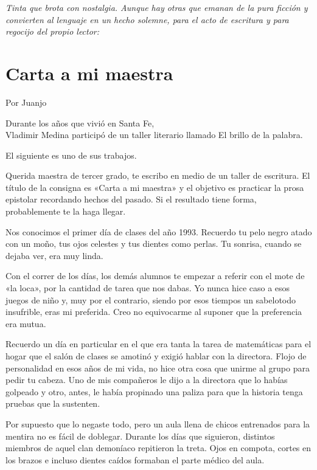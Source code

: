 \documentclass[11pt,twoside,openright,a5paper]{book}
\begin{document}
\vspace{0.5cm}
\emph{Tinta que brota con nostalgia. Aunque hay otras que emanan de la pura ficción y convierten al lenguaje en un hecho solemne, para el acto de escritura y para regocijo del propio lector:}

\section*{Carta a mi maestra}

\begin{flushright}Por Juanjo\end{flushright}

\begin{flushright}
Durante los años que vivió en Santa Fe,\\
Vladimir Medina participó de un taller literario llamado El brillo de la palabra.

El siguiente es uno de sus trabajos.
\end{flushright}

Querida maestra de tercer grado, te escribo en medio de un taller de escritura. El título de la consigna es «Carta a mi maestra» y el objetivo es practicar la prosa epistolar recordando hechos del pasado. Si el resultado tiene forma, probablemente te la haga llegar.

Nos conocimos el primer día de clases del año 1993. Recuerdo tu pelo negro atado con un moño, tus ojos celestes y tus dientes como perlas. Tu sonrisa, cuando se dejaba ver, era muy linda.

Con el correr de los días, los demás alumnos te empezar a referir con el mote de «la loca»,  por la cantidad de tarea que nos dabas. Yo nunca hice caso a esos juegos de niño y, muy por el contrario, siendo por esos tiempos un sabelotodo insufrible, eras mi preferida. Creo no equivocarme al suponer que la preferencia era mutua.

Recuerdo un día en particular en el que era tanta la tarea de matemáticas para el hogar que el salón de clases se amotinó y exigió hablar con la directora. Flojo de personalidad en esos años de mi vida, no hice otra cosa que unirme al grupo para pedir tu cabeza. Uno de mis compañeros le dijo a la directora que lo habías golpeado y otro, antes, le había propinado una paliza para que la historia tenga pruebas que la sustenten. 

Por supuesto que lo negaste todo, pero un aula llena de chicos entrenados para la mentira no es fácil de doblegar. Durante los días que siguieron, distintos miembros de aquel clan demoníaco repitieron la treta. Ojos en compota, cortes en los brazos e incluso dientes caídos formaban el parte médico del aula.
\end{document}
